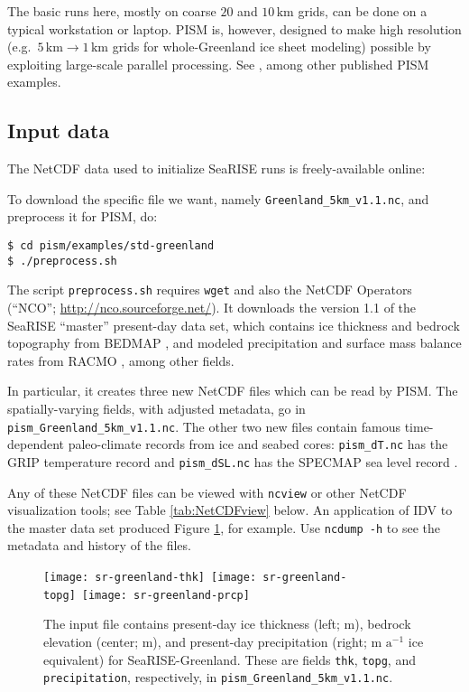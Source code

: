 The basic runs here, mostly on coarse $20$ and $10\,\textrm{km}$ grids, can be done on a typical workstation or laptop.  PISM is, however, designed to make high resolution (e.g.~$5\,\textrm{km} \to 1\,\textrm{km}$ grids for whole-Greenland ice sheet modeling) possible by exploiting large-scale parallel processing.  See \cite{AschwandenAdalgeirsdottirKhroulev,Golledgeetal2012,Golledgeetal2013}, among other published PISM examples.


\subsection{Input data}

The NetCDF data used to initialize SeaRISE runs is freely-available online: 
\medskip

\centerline{}
\medskip

\noindent To download the specific file we want, namely \texttt{Greenland_5km_v1.1.nc}, and preprocess it for PISM, do:
\begin{verbatim}
$ cd pism/examples/std-greenland
$ ./preprocess.sh
\end{verbatim}
\noindent The script \texttt{preprocess.sh} requires \texttt{wget} and also the NetCDF Operators (``NCO''; \url{http://nco.sourceforge.net/}).  It downloads the version 1.1 of the SeaRISE ``master'' present-day data set, which contains ice thickness and bedrock topography from BEDMAP \cite{BamberLayberryGogenini}, and modeled precipitation and surface mass balance rates from RACMO \cite{Ettemaetal2009}, among other fields.

In particular, it creates three new NetCDF files which can be read by PISM.  The spatially-varying fields, with adjusted metadata, go in \texttt{pism_Greenland_5km_v1.1.nc}.  The other two new files contain famous time-dependent paleo-climate records from ice and seabed cores: \texttt{pism_dT.nc} has the GRIP temperature record \cite{JohnsenetalGRIP} and \texttt{pism_dSL.nc} has the SPECMAP sea level record \cite{Imbrieetal1984}.

Any of these NetCDF files can be viewed with \texttt{ncview} or other NetCDF visualization tools; see Table \ref{tab:NetCDFview} below.  An application of IDV to the master data set produced Figure \ref{fig:sr-input}, for example.  Use \texttt{ncdump -h} to see the metadata and history of the files.

\begin{figure}[ht]
\centering
\mbox{\texttt{[image: sr-greenland-thk]}
  \qquad
  \texttt{[image: sr-greenland-topg]}
  \qquad
  \texttt{[image: sr-greenland-prcp]}}
\caption{The input file contains present-day ice thickness (left; m), bedrock elevation (center; m), and present-day precipitation (right; m $\text{a}^{-1}$ ice equivalent) for SeaRISE-Greenland.  These are fields \texttt{thk}, \texttt{topg}, and \texttt{precipitation}, respectively, in \texttt{pism_Greenland_5km_v1.1.nc}.}
\label{fig:sr-input}
\end{figure}


